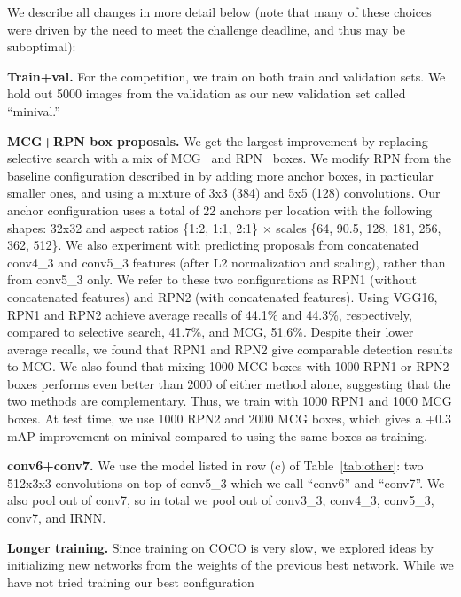 \documentclass[10pt,twocolumn,letterpaper]{article}
\begin{document}
We describe all changes in more detail below (note that many of these choices
were driven by the need to meet the challenge deadline, and thus may be
suboptimal):
\begin{packed_enum}
  \item \textbf{Train+val.}  For the competition, we train on both train and
    validation sets.  We hold out 5000 images from the validation as our new
    validation set called ``minival.''
  \item \textbf{MCG+RPN box proposals.} We get the largest improvement by
    replacing selective search with a mix of MCG~\cite{MCG-PABMM2015} and
    RPN~\cite{ren2015faster} boxes.  We modify RPN from the baseline
    configuration described in
    \cite{ren2015faster} by adding more anchor boxes, in particular
    smaller ones, and using a mixture of 3x3 (384) and 5x5 (128) convolutions.
    Our anchor configuration uses a total of 22 anchors per location
    with the following shapes:
    32x32 and aspect ratios \{1:2, 1:1, 2:1\} $\times$ scales \{64, 90.5, 128,
    181, 256, 362, 512\}.
    We also experiment with predicting proposals from concatenated conv4\_3
    and conv5\_3 features (after L2 normalization and scaling), rather than
    from conv5\_3 only. We refer to these two configurations as RPN1
    (without concatenated features) and RPN2 (with concatenated features).
    Using VGG16, RPN1 and RPN2 achieve average recalls of 44.1\% and 44.3\%, respectively,
    compared to selective search, 41.7\%, and MCG, 51.6\%.
    Despite their lower average recalls, we found that RPN1 and RPN2 give
    comparable detection results to MCG.
    We also found that mixing 1000 MCG boxes with 1000 RPN1 or RPN2 boxes
    performs even better than 2000 of either method alone, suggesting that the
    two methods are complementary.
    Thus, we train with 1000 RPN1 and 1000 MCG boxes. At test time, we use 1000
    RPN2 and 2000 MCG boxes, which gives a +0.3 mAP improvement on minival
    compared to using the same boxes as training.
  \item \textbf{conv6+conv7.}  We use the model listed in row (c) of
    Table~\ref{tab:other}: two 512x3x3 convolutions on top of conv5\_3 which we
    call ``conv6'' and ``conv7''.  We also pool out of conv7, so in total we
    pool out of conv3\_3, conv4\_3, conv5\_3, conv7, and IRNN.
  \item \textbf{Longer training.}  Since training on COCO is very slow, we
  explored ideas by initializing new networks from the weights of the previous
  best network.  While we have not tried training our best configuration

\end{packed_enum}
\end{document}
